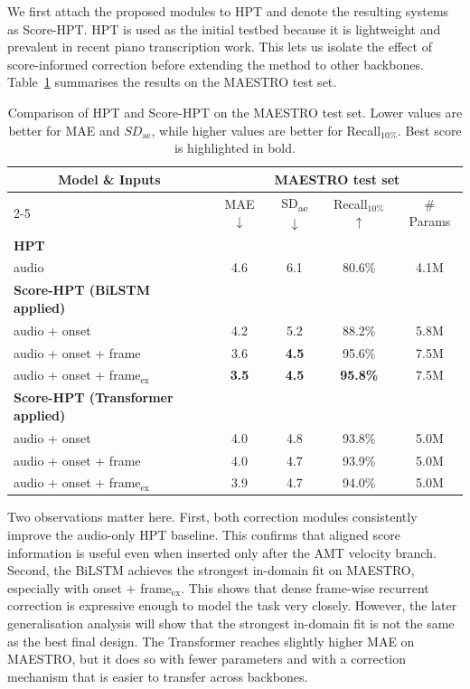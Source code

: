 We first attach the proposed modules to HPT and denote the resulting systems as Score-HPT. HPT is used as the initial testbed because it is lightweight and prevalent in recent piano transcription work. This lets us isolate the effect of score-informed correction before extending the method to other backbones. Table~\ref{tab:scoreinf_maestro} summarises the results on the MAESTRO test set.

\begin{table}[!htbp]
    \centering
    \caption{Comparison of HPT and Score-HPT on the MAESTRO test set. Lower values are better for MAE and \(SD_{\mathrm{ae}}\), while higher values are better for Recall$_{10\%}$. Best score is highlighted in bold.}
    \label{tab:scoreinf_maestro}
    \setlength{\tabcolsep}{10pt}
    \fontsize{11pt}{13pt}\selectfont
    \renewcommand{\arraystretch}{1.2}
    \begin{tabular}{l|cccc}
    \toprule
    \multicolumn{1}{c|}{\multirow{2}{*}{\textbf{Model \& Inputs}}}
      & \multicolumn{4}{c}{\textbf{MAESTRO test set}} \\
    \cmidrule(l){2-5}
      & MAE $\downarrow$ & SD\textsubscript{ae} $\downarrow$ & Recall$_{10\%}$ $\uparrow$ & \# Params \\
    \midrule
    \textbf{HPT} & & & & \\
    audio & 4.6 & 6.1 & 80.6\% & 4.1M \\
    \midrule
    \textbf{Score-HPT (BiLSTM applied)} & & & & \\
    audio + onset & 4.2 & 5.2 & 88.2\% & 5.8M \\
    audio + onset + frame & 3.6 & \textbf{4.5} & 95.6\% & 7.5M \\
    audio + onset + frame$_{\text{ex}}$ & \textbf{3.5} & \textbf{4.5} & \textbf{95.8\%} & 7.5M \\
    \midrule
    \textbf{Score-HPT (Transformer applied)} & & & & \\
    audio + onset & 4.0 & 4.8 & 93.8\% & 5.0M \\
    audio + onset + frame & 4.0 & 4.7 & 93.9\% & 5.0M \\
    audio + onset + frame$_{\text{ex}}$ & 3.9 & 4.7 & 94.0\% & 5.0M \\
    \bottomrule
    \end{tabular}
\end{table}

Two observations matter here. First, both correction modules consistently improve the audio-only HPT baseline. This confirms that aligned score information is useful even when inserted only after the AMT velocity branch. Second, the BiLSTM achieves the strongest in-domain fit on MAESTRO, especially with onset $+$ frame$_{\text{ex}}$. This shows that dense frame-wise recurrent correction is expressive enough to model the task very closely. However, the later generalisation analysis will show that the strongest in-domain fit is not the same as the best final design. The Transformer reaches slightly higher MAE on MAESTRO, but it does so with fewer parameters and with a correction mechanism that is easier to transfer across backbones.


